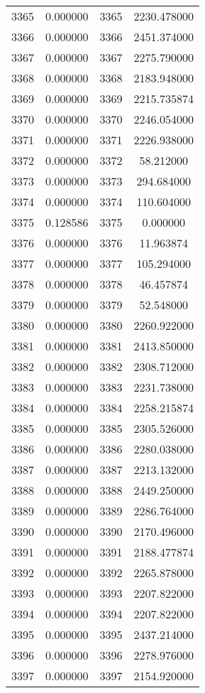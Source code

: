 \documentclass[12pt]{article}
\begin{document}
\begin{longtable}{@{}cccc@{}}
3365 & 0.000000 & 3365 & 2230.478000 \\
3366 & 0.000000 & 3366 & 2451.374000 \\
3367 & 0.000000 & 3367 & 2275.790000 \\
3368 & 0.000000 & 3368 & 2183.948000 \\
3369 & 0.000000 & 3369 & 2215.735874 \\
3370 & 0.000000 & 3370 & 2246.054000 \\
3371 & 0.000000 & 3371 & 2226.938000 \\
3372 & 0.000000 & 3372 & 58.212000 \\
3373 & 0.000000 & 3373 & 294.684000 \\
3374 & 0.000000 & 3374 & 110.604000 \\
3375 & 0.128586 & 3375 & 0.000000 \\
3376 & 0.000000 & 3376 & 11.963874 \\
3377 & 0.000000 & 3377 & 105.294000 \\
3378 & 0.000000 & 3378 & 46.457874 \\
3379 & 0.000000 & 3379 & 52.548000 \\
3380 & 0.000000 & 3380 & 2260.922000 \\
3381 & 0.000000 & 3381 & 2413.850000 \\
3382 & 0.000000 & 3382 & 2308.712000 \\
3383 & 0.000000 & 3383 & 2231.738000 \\
3384 & 0.000000 & 3384 & 2258.215874 \\
3385 & 0.000000 & 3385 & 2305.526000 \\
3386 & 0.000000 & 3386 & 2280.038000 \\
3387 & 0.000000 & 3387 & 2213.132000 \\
3388 & 0.000000 & 3388 & 2449.250000 \\
3389 & 0.000000 & 3389 & 2286.764000 \\
3390 & 0.000000 & 3390 & 2170.496000 \\
3391 & 0.000000 & 3391 & 2188.477874 \\
3392 & 0.000000 & 3392 & 2265.878000 \\
3393 & 0.000000 & 3393 & 2207.822000 \\
3394 & 0.000000 & 3394 & 2207.822000 \\
3395 & 0.000000 & 3395 & 2437.214000 \\
3396 & 0.000000 & 3396 & 2278.976000 \\
3397 & 0.000000 & 3397 & 2154.920000 \\

\end{longtable}
\end{document}
